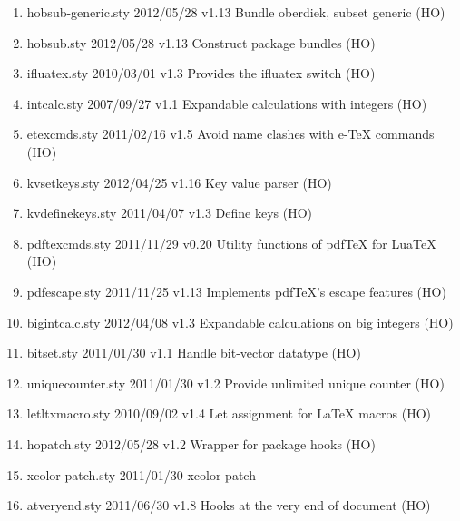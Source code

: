\begin{enumerate}
\item 		 hobsub-generic.sty 2012/05/28 v1.13 Bundle oberdiek, subset generic (HO)
\item 		 hobsub.sty 2012/05/28 v1.13 Construct package bundles (HO)
\item 		 ifluatex.sty 2010/03/01 v1.3 Provides the ifluatex switch (HO)
\item 		 intcalc.sty 2007/09/27 v1.1 Expandable calculations with integers (HO)
\item 		 etexcmds.sty 2011/02/16 v1.5 Avoid name clashes with e-TeX commands (HO)
\item 		 kvsetkeys.sty 2012/04/25 v1.16 Key value parser (HO)
\item 		 kvdefinekeys.sty 2011/04/07 v1.3 Define keys (HO)
\item pdftexcmds.sty 2011/11/29 v0.20 Utility functions of pdfTeX for LuaTeX (HO)
\item pdfescape.sty 2011/11/25 v1.13 Implements pdfTeX's escape features (HO)
\item bigintcalc.sty 2012/04/08 v1.3 Expandable calculations on big integers (HO)
\item bitset.sty 2011/01/30 v1.1 Handle bit-vector datatype (HO)
\item 		 uniquecounter.sty 2011/01/30 v1.2 Provide unlimited unique counter (HO)
\item 		 letltxmacro.sty 2010/09/02 v1.4 Let assignment for LaTeX macros (HO)
\item 		 hopatch.sty 2012/05/28 v1.2 Wrapper for package hooks (HO)
\item 		 xcolor-patch.sty 2011/01/30 xcolor patch
\item atveryend.sty 2011/06/30 v1.8 Hooks at the very end of document (HO)

\end{enumerate}
